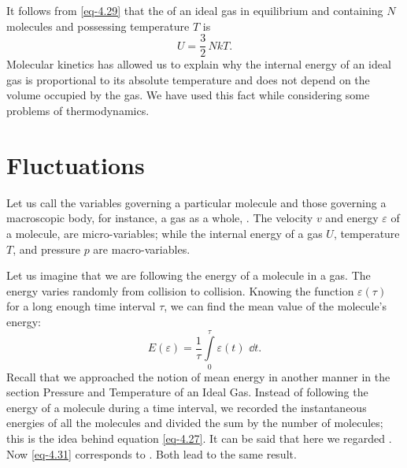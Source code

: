 It follows from \eqref{eq-4.29} that the  of an ideal gas in equilibrium and containing $N$ molecules and possessing temperature $T$ is
\begin{equation}%
U = \frac{3}{2}\,NkT.
\label{energy-gas3}
\end{equation}
Molecular kinetics has allowed us to explain why the internal energy of an ideal gas is proportional to its absolute temperature and does not depend on the volume occupied by the gas. We have used this fact while considering some problems of thermodynamics.


\section{Fluctuations }

 Let us call the variables governing a particular molecule  and those governing a macroscopic body, for instance, a gas as a whole, . The velocity $v$ and energy $\varepsilon$ of a molecule, are micro-variables; while the internal energy of a gas $U$, temperature $T$, and pressure $p$ are macro-variables.

Let us imagine that we are following the energy of a molecule in
a gas. The energy varies randomly from collision to collision. Knowing
the function $\varepsilon (\tau)$ for a long enough time interval $\tau$, we can find the mean value of the molecule's energy:
\begin{equation}%
E(\varepsilon) = \frac{1}{\tau} \int\limits_{0}^{\tau} \varepsilon (t)\,\, \dd t.
\label{eq-4.31}
\end{equation}
Recall that we approached the notion of mean energy in another manner in the section Pressure and Temperature of an Ideal Gas. Instead of following the energy of a molecule during a time interval, we recorded the instantaneous energies of all the molecules and divided the sum by the number of molecules; this is the idea behind equation \eqref{eq-4.27}. It can be said that here we regarded . Now \eqref{eq-4.31} corresponds to . Both lead to the same result.

